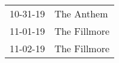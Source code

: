 \begin{supertabular}{p{0.07\textwidth}p{0.23\textwidth}}
 10-31-19 &    The Anthem \\
 11-01-19 &  The Fillmore \\
 11-02-19 &  The Fillmore \\
\end{supertabular}
